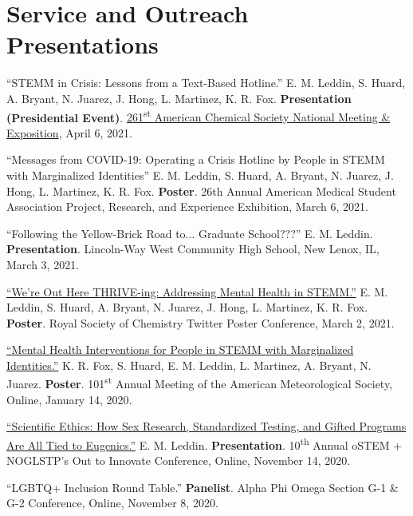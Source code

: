 \documentclass[letterpaper,11pt]{article}
\begin{document}
\section{Service and Outreach Presentations}
\begin{etaremune}[start=15]
\small{
  \item \textnormal{``STEMM in Crisis: Lessons from a Text-Based Hotline.'' E. M. Leddin, S. Huard, A. Bryant, N. Juarez, J. Hong, L. Martinez, K. R. Fox. \textbf{Presentation (Presidential Event)}. \href{https://bit.ly/2021-THRIVE-ACS}{261\textsuperscript{st} American Chemical Society National Meeting \& Exposition}, April 6, 2021.}
  \item \textnormal{``Messages from COVID-19: Operating a Crisis Hotline by People in STEMM with Marginalized Identities'' E. M. Leddin, S. Huard, A. Bryant, N. Juarez, J. Hong, L. Martinez, K. R. Fox. \textbf{Poster}. 26th Annual American Medical Student Association Project, Research, and Experience Exhibition, March 6, 2021.}
  \item \textnormal{``Following the Yellow-Brick Road to... Graduate School???'' E. M. Leddin. \textbf{Presentation}. Lincoln-Way West Community High School, New Lenox, IL, March 3, 2021.}
  \item \textnormal{\href{https://twitter.com/ThriveLifeline/status/1366720589130592259?s=20}{``We're Out Here THRIVE-ing: Addressing Mental Health in STEMM.''} E. M. Leddin, S. Huard, A. Bryant, N. Juarez, J. Hong, L. Martinez, K. R. Fox. \textbf{Poster}. Royal Society of Chemistry Twitter Poster Conference, March 2, 2021.}
  \item \textnormal{\href{https://bit.ly/2020-oSTEM-Ethics}{``Mental Health Interventions for People in STEMM with Marginalized Identities.''} K. R. Fox, S. Huard, E. M. Leddin, L. Martinez, A. Bryant, N. Juarez. \textbf{Poster}. 101\textsuperscript{st} Annual Meeting of the American Meteorological Society, Online, January 14, 2020.}
  \item \textnormal{\href{https://bit.ly/2020-oSTEM-Ethics}{``Scientific Ethics: How Sex Research, Standardized Testing, and Gifted Programs Are All Tied to Eugenics.''} E. M. Leddin. \textbf{Presentation}. 10\textsuperscript{th} Annual oSTEM + NOGLSTP's Out to Innovate\texttrademark{} Conference, Online, November 14, 2020.}
  \item \textnormal{``LGBTQ+ Inclusion Round Table.'' \textbf{Panelist}. Alpha Phi Omega Section G-1 \& G-2 Conference, Online, November 8, 2020.}
}
\end{etaremune}
\end{document}
